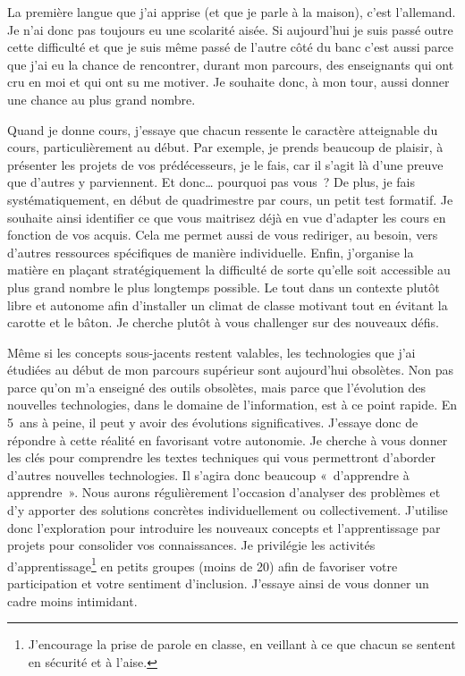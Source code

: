 La première langue que j'ai apprise (et que je parle à la maison), c'est l'allemand. Je n'ai donc pas toujours eu une scolarité aisée. Si aujourd'hui je suis passé outre cette difficulté et que je suis même passé de l'autre côté du banc c'est aussi parce que j'ai eu la chance de rencontrer, durant mon parcours, des enseignants qui ont cru en moi et qui ont su me motiver. Je souhaite donc, à mon tour, aussi donner une chance au plus grand nombre.

Quand je donne cours, j’essaye que chacun ressente le caractère atteignable du cours, particulièrement au début. Par exemple, je prends beaucoup de plaisir, à présenter les projets de vos prédécesseurs, je le fais, car il s’agit là d’une preuve que d’autres y parviennent. Et donc… pourquoi pas vous~? De plus, je fais systématiquement, en début de quadrimestre par cours, un petit test formatif. Je souhaite ainsi identifier ce que vous maitrisez déjà en vue d’adapter les cours en fonction de vos acquis. Cela me permet aussi de vous rediriger, au besoin, vers d'autres ressources spécifiques de manière individuelle. Enfin, j'organise la matière en plaçant stratégiquement la difficulté de sorte qu'elle soit accessible au plus grand nombre le plus longtemps possible. Le tout dans un contexte plutôt libre et autonome afin d'installer un climat de classe motivant tout en évitant la carotte et le bâton. Je cherche plutôt à vous challenger sur des nouveaux défis.

Même si les concepts sous-jacents restent valables, les technologies que j'ai étudiées au début de mon parcours supérieur sont aujourd'hui obsolètes. Non pas parce qu'on m'a enseigné des outils obsolètes, mais parce que l'évolution des nouvelles technologies, dans le domaine de l'information, est à ce point rapide. En 5~ans à peine, il peut y avoir des évolutions significatives. J’essaye donc de répondre à cette réalité en favorisant votre autonomie. Je cherche à vous donner les clés pour comprendre les textes techniques qui vous permettront d’aborder d’autres nouvelles technologies. Il s’agira donc beaucoup «~d’apprendre à apprendre~». Nous aurons régulièrement l’occasion d’analyser des problèmes et d’y apporter des solutions concrètes individuellement ou collectivement. J’utilise donc l'exploration pour introduire les nouveaux concepts et l’apprentissage par projets pour consolider vos connaissances. Je privilégie les activités d’apprentissage\footnote{J'encourage la prise de parole en classe, en veillant à ce que chacun se sentent en sécurité et à l'aise.} en petits groupes (moins de 20) afin de favoriser votre participation et votre sentiment d’inclusion. J’essaye ainsi de vous donner un cadre moins intimidant.


